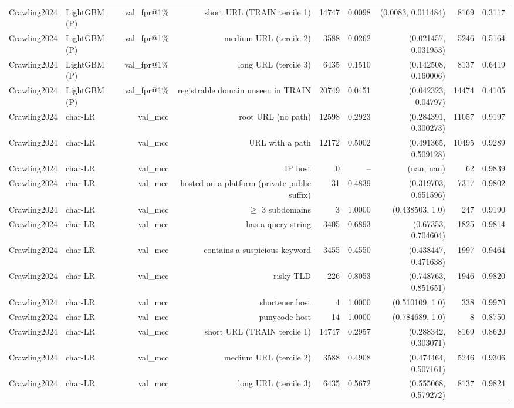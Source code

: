\begin{table}[t]
\begin{tabular}{llrrrrrrr}
Crawling2024 & LightGBM (P) & val\_fpr@1\% & short URL (TRAIN tercile 1) & 14747 & 0.0098 & (0.0083, 0.011484) & 8169 & 0.3117 \\
Crawling2024 & LightGBM (P) & val\_fpr@1\% & medium URL (tercile 2) & 3588 & 0.0262 & (0.021457, 0.031953) & 5246 & 0.5164 \\
Crawling2024 & LightGBM (P) & val\_fpr@1\% & long URL (tercile 3) & 6435 & 0.1510 & (0.142508, 0.160006) & 8137 & 0.6419 \\
Crawling2024 & LightGBM (P) & val\_fpr@1\% & registrable domain unseen in TRAIN & 20749 & 0.0451 & (0.042323, 0.04797) & 14474 & 0.4105 \\
Crawling2024 & char-LR & val\_mcc & root URL (no path) & 12598 & 0.2923 & (0.284391, 0.300273) & 11057 & 0.9197 \\
Crawling2024 & char-LR & val\_mcc & URL with a path & 12172 & 0.5002 & (0.491365, 0.509128) & 10495 & 0.9289 \\
Crawling2024 & char-LR & val\_mcc & IP host & 0 & -- & (nan, nan) & 62 & 0.9839 \\
Crawling2024 & char-LR & val\_mcc & hosted on a platform (private public suffix) & 31 & 0.4839 & (0.319703, 0.651596) & 7317 & 0.9802 \\
Crawling2024 & char-LR & val\_mcc & $\geq$ 3 subdomains & 3 & 1.0000 & (0.438503, 1.0) & 247 & 0.9190 \\
Crawling2024 & char-LR & val\_mcc & has a query string & 3405 & 0.6893 & (0.67353, 0.704604) & 1825 & 0.9814 \\
Crawling2024 & char-LR & val\_mcc & contains a suspicious keyword & 3455 & 0.4550 & (0.438447, 0.471638) & 1997 & 0.9464 \\
Crawling2024 & char-LR & val\_mcc & risky TLD & 226 & 0.8053 & (0.748763, 0.851651) & 1946 & 0.9820 \\
Crawling2024 & char-LR & val\_mcc & shortener host & 4 & 1.0000 & (0.510109, 1.0) & 338 & 0.9970 \\
Crawling2024 & char-LR & val\_mcc & punycode host & 14 & 1.0000 & (0.784689, 1.0) & 8 & 0.8750 \\
Crawling2024 & char-LR & val\_mcc & short URL (TRAIN tercile 1) & 14747 & 0.2957 & (0.288342, 0.303071) & 8169 & 0.8620 \\
Crawling2024 & char-LR & val\_mcc & medium URL (tercile 2) & 3588 & 0.4908 & (0.474464, 0.507161) & 5246 & 0.9306 \\
Crawling2024 & char-LR & val\_mcc & long URL (tercile 3) & 6435 & 0.5672 & (0.555068, 0.579272) & 8137 & 0.9824 \\

\end{tabular}
\end{table}
